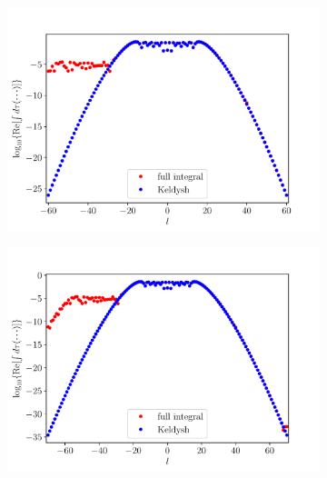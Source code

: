 \begin{figure}
\begin{subfigure}[b]{0.33\linewidth}
  \end{subfigure}
  \begin{subfigure}[b]{0.33\linewidth}
    \includegraphics[width=\textwidth]{figures/ch_ATI_SFA/1b1/l60n512WP40PG25MR35vsKeldysh.pdf}
  \end{subfigure}
  \begin{subfigure}[b]{0.33\linewidth}
    \includegraphics[width=\textwidth]{figures/ch_ATI_SFA/1b1/l70n512WP40PG25MR35vsKeldysh.pdf}
  \end{subfigure}
  \begin{subfigure}[b]{0.33\linewidth}

\end{subfigure}
\end{figure}
